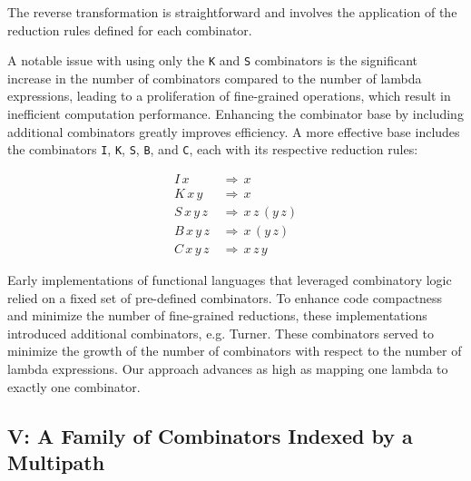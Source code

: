 \documentclass{IEEEtran}
\begin{document}
\begingroup
\vspace*{-\baselineskip}
\vspace*{\baselineskip}
\endgroup

\par The reverse transformation is straightforward and involves the application of the reduction rules defined for each combinator.

\par A notable issue with using only the \verb!K! and \verb!S! combinators is the significant increase in the number of combinators compared to the number of lambda expressions, leading to a proliferation of fine-grained operations, which result in inefficient computation performance. Enhancing the combinator base by including additional combinators greatly improves efficiency. A more effective base includes the combinators \texttt{I}, \texttt{K}, \texttt{S}, \texttt{B}, and \texttt{C}, each with its respective reduction rules:

\begin{align*}
I \, x \, &\Rightarrow \, x \\
K \, x \, y \, &\Rightarrow \, x \\
S \, x \, y \, z \, &\Rightarrow \, x \, z \, (y \, z) \\
B \, x \, y \, z \, &\Rightarrow \, x \, (y \, z) \\
C \, x \, y \, z \, &\Rightarrow \, x \, z \, y
\end{align*}

\begingroup
\vspace*{-\baselineskip}
\vspace*{\baselineskip}
\endgroup

\par Early implementations of functional languages that leveraged combinatory logic relied on a fixed set of pre-defined combinators. To enhance code compactness and minimize the number of fine-grained reductions, these implementations introduced additional combinators, e.g. Turner. These combinators served to minimize the growth of the number of combinators with respect to the number of lambda expressions. Our approach advances as high as mapping one lambda to exactly one combinator.

\subsection{V: A Family of Combinators Indexed by a Multipath}\label{VComb}
\end{document}
